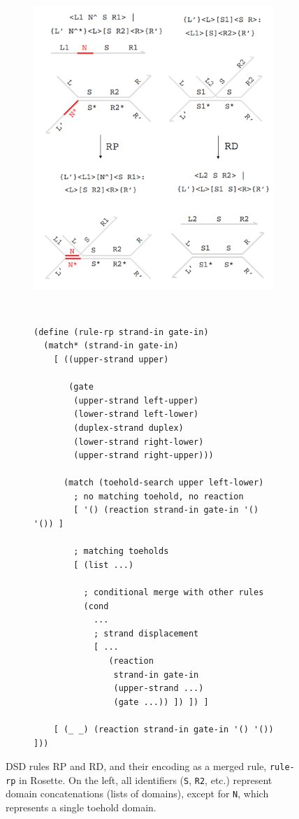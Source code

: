 \documentclass{article}[10pt]
\begin{document}
\begin{figure}[h]

\begin{subfigure}[c]{0.5\textwidth}
\includegraphics[width=\textwidth]{figures/rule-merge.png}
\end{subfigure}
~
\begin{subfigure}[c]{0.5\textwidth}
\begin{lstlisting}[basicstyle=\footnotesize\ttfamily]
(define (rule-rp strand-in gate-in)
  (match* (strand-in gate-in)
    [ ((upper-strand upper)

       (gate
        (upper-strand left-upper)
        (lower-strand left-lower)
        (duplex-strand duplex)
        (lower-strand right-lower)
        (upper-strand right-upper)))

      (match (toehold-search upper left-lower)
        ; no matching toehold, no reaction
        [ '() (reaction strand-in gate-in '() '()) ]

        ; matching toeholds
        [ (list ...)

          ; conditional merge with other rules
          (cond
            ...
            ; strand displacement
            [ ...
               (reaction
                strand-in gate-in
                (upper-strand ...)
                (gate ...)) ]) ]) ]

    [ (_ _) (reaction strand-in gate-in '() '()) ]))
\end{lstlisting}
\end{subfigure}
\caption{
DSD rules RP and RD, and their encoding as a merged rule, \lstinline{rule-rp} in
Rosette.  On the left, all identifiers (\lstinline{S}, \lstinline{R2}, etc.)
represent domain concatenations (lists of domains), except for \lstinline{N},
which represents a single toehold domain.
}
\label{figure:example-rule}
\end{figure}
\end{document}
